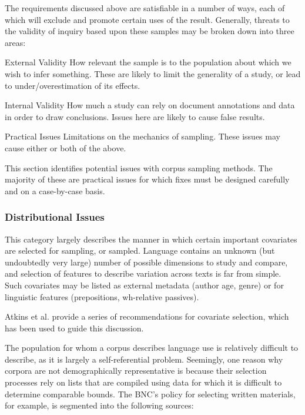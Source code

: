

The requirements discussed above are satisfiable in a number of ways, each of which will exclude and promote certain uses of the result.  Generally, threats to the validity of inquiry based upon these samples may be broken down into three areas:

\begin{itemizeTitle}
    \item[External Validity] How relevant the sample is to the population about which we wish to infer something.  These are likely to limit the generality of a study, or lead to under/overestimation of its effects.
    \item[Internal Validity] How much a study can rely on document annotations and data in order to draw conclusions.  Issues here are likely to cause false results.
    \item[Practical Issues] Limitations on the mechanics of sampling.  These issues may cause either or both of the above.
\end{itemizeTitle}

This section identifies potential issues with corpus sampling methods.  The majority of these are practical issues for which fixes must be designed carefully and on a case-by-case basis.


\subsubsection{Distributional Issues}
This category largely describes the manner in which certain important covariates are selected for sampling, or sampled.  Language contains an unknown (but undoubtedly very large) number of possible dimensions to study and compare, and selection of features to describe variation across texts is far from simple.  Such covariates may be listed as external metadata (author age, genre) or for linguistic features (prepositions, wh-relative passives).

Atkins et al.\cite{atkins1992corpus} provide a series of recommendations for covariate selection, which has been used to guide this discussion.

The population for whom a corpus describes language use is relatively difficult to describe, as it is largely a self-referential problem.  Seemingly, one reason why corpora are not demographically representative is because their selection processes rely on lists that are compiled using data for which it is difficult to determine comparable bounds.  The BNC's policy for selecting written materials, for example, is segmented into the following sources:

